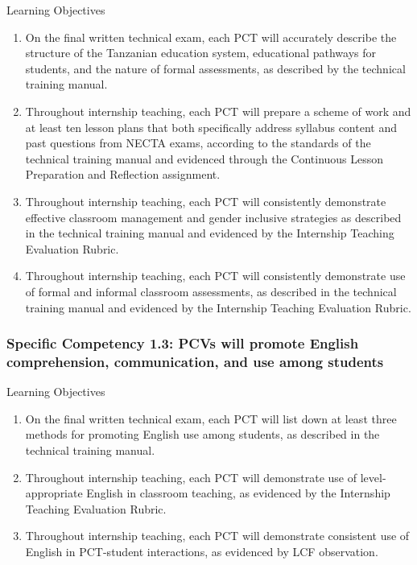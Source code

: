 Learning Objectives
\begin{enumerate}
\item On the final written technical exam, each PCT will accurately describe
the structure of the Tanzanian education system, educational pathways
for students, and the nature of formal assessments, as described by the
technical training manual.
\item Throughout internship teaching, each PCT will prepare a scheme of
work and at least ten lesson plans that both specifically address syllabus content and past questions from NECTA exams, according to the
standards of the technical training manual and evidenced through the
Continuous Lesson Preparation and Reflection assignment.
\item Throughout internship teaching, each PCT will consistently demonstrate effective classroom management and gender inclusive strategies as described in the technical training manual and evidenced by the
Internship Teaching Evaluation Rubric.
\item Throughout internship teaching, each PCT will consistently demonstrate use of formal and informal classroom assessments, as described in the technical training manual and evidenced by the Internship Teaching Evaluation Rubric.
\end{enumerate}

\subsubsection*{Specific Competency 1.3: PCVs will promote English
comprehension, communication, and use among students}

Learning Objectives
\begin{enumerate}
\item On the final written technical exam, each PCT will list down at least
three methods for promoting English use among students, as described
in the technical training manual.

\item Throughout internship teaching, each PCT will demonstrate use of
level-appropriate English in classroom teaching, as evidenced by the
Internship Teaching Evaluation Rubric.

\item Throughout internship teaching, each PCT will demonstrate consistent use of English in PCT-student interactions, as evidenced by LCF
observation.
\end{enumerate}

